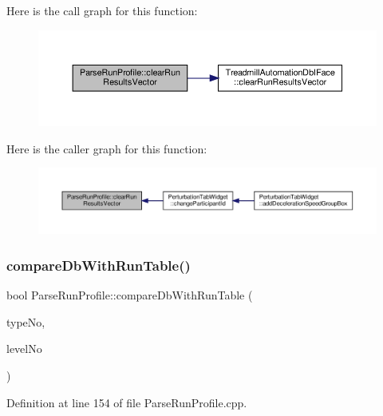 Here is the call graph for this function\+:
\nopagebreak
\begin{figure}[H]
\begin{center}
\leavevmode
\includegraphics[width=350pt]{class_parse_run_profile_aa00fa199f81ef8745e8e2c1e086cdf00_cgraph}
\end{center}
\end{figure}
Here is the caller graph for this function\+:
\nopagebreak
\begin{figure}[H]
\begin{center}
\leavevmode
\includegraphics[width=350pt]{class_parse_run_profile_aa00fa199f81ef8745e8e2c1e086cdf00_icgraph}
\end{center}
\end{figure}
\mbox{\label{class_parse_run_profile_a474ddfd418805f06313732935611ac37}} 
\subsubsection{\texorpdfstring{compare\+Db\+With\+Run\+Table()}{compareDbWithRunTable()}}
{\footnotesize\ttfamily bool Parse\+Run\+Profile\+::compare\+Db\+With\+Run\+Table (\begin{DoxyParamCaption}\item[{Q\+String}]{type\+No,  }\item[{Q\+String}]{level\+No }\end{DoxyParamCaption})}



Definition at line 154 of file Parse\+Run\+Profile.\+cpp.


